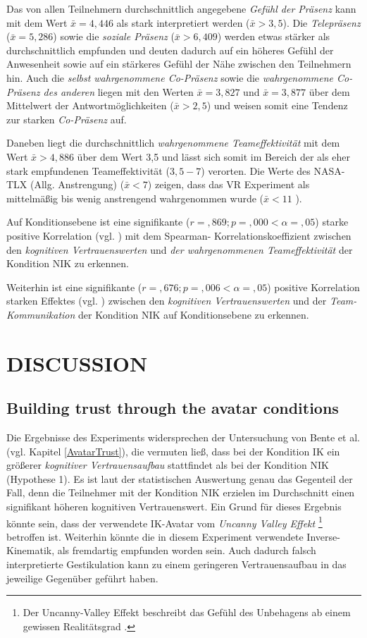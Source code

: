 \documentclass[sigchi]{acmart}
\begin{document}
Das von allen Teilnehmern durchschnittlich angegebene \textit{Gefühl der Präsenz} kann mit dem Wert $\bar{x} = 4,446$ als stark interpretiert werden ($\bar{x} > 3,5$). Die \textit{Telepräsenz} ($\bar{x} = 5,286$) sowie die \textit{soziale Präsenz} ($\bar{x} > 6,409$) werden etwas stärker als durchschnittlich empfunden und deuten dadurch auf ein höheres Gefühl der Anwesenheit sowie auf ein stärkeres Gefühl der Nähe zwischen den Teilnehmern hin. Auch die \textit{selbst wahrgenommene Co-Präsenz} sowie die \textit{wahrgenommene Co-Präsenz des anderen} liegen mit den Werten $\bar{x} = 3,827$ und $\bar{x} = 3,877$ über dem Mittelwert der Antwortmöglichkeiten ($\bar{x} > 2,5$) und weisen somit eine Tendenz zur starken \textit{Co-Präsenz} auf.

Daneben liegt die durchschnittlich \textit{wahrgenommene Teameffektivität} mit dem Wert $\bar{x} > 4,886$ über dem Wert 3,5 und lässt sich somit im Bereich der als eher stark empfundenen Teameffektivität ($3,5 - 7$) verorten.
Die Werte des NASA-TLX (Allg. Anstrengung) ($\bar{x} < 7$) zeigen, dass das VR Experiment als mittelmäßig bis wenig anstrengend wahrgenommen wurde ($\bar{x} < 11$ ).

Auf Konditionsebene ist eine signifikante ($r =,869; p =,000 < \alpha = ,05$) starke positive Korrelation (vgl. \citep{cohen2013statistical}) mit dem Spearman- Korrelationskoeffizient  zwischen den \textit{kognitiven Vertrauenswerten} und \textit{der wahrgenommenen Teameffektivität} der Kondition NIK zu erkennen.

Weiterhin ist eine signifikante ($r =,676; p =,006 < \alpha = ,05$) positive Korrelation starken Effektes (vgl. \citep{cohen2013statistical}) zwischen den \textit{kognitiven Vertrauenswerten} und der \textit{Team-Kommunikation} der Kondition NIK auf Konditionsebene zu erkennen.

\section{DISCUSSION}
\subsection{Building trust through the avatar conditions}
Die Ergebnisse des Experiments widersprechen der Untersuchung von Bente et al. (vgl. Kapitel \ref{AvatarTrust}), die vermuten ließ, dass bei der Kondition IK ein größerer \textit{kognitiver Vertrauensaufbau} stattfindet als bei der Kondition NIK (Hypothese 1). Es ist laut der statistischen Auswertung genau das Gegenteil der Fall, denn die Teilnehmer mit der Kondition NIK erzielen im Durchschnitt einen signifikant höheren kognitiven Vertrauenswert.
Ein Grund für dieses Ergebnis könnte sein, dass der verwendete IK-Avatar vom \textit{Uncanny Valley Effekt} \footnote{Der Uncanny-Valley Effekt beschreibt das Gefühl des Unbehagens ab einem gewissen Realitätsgrad  \citep[S. 352-353]{gast2011unheimliche}.} betroffen ist.
Weiterhin könnte die in diesem Experiment verwendete Inverse-Kinematik, als fremdartig empfunden worden sein. Auch dadurch falsch interpretierte Gestikulation kann zu einem geringeren Vertrauensaufbau in das jeweilige Gegenüber geführt haben.
\end{document}
